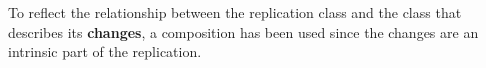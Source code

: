 


To reflect the relationship between the replication class and the class that describes its \textbf {changes}, a composition has been used since the changes are an intrinsic part of the replication. 

